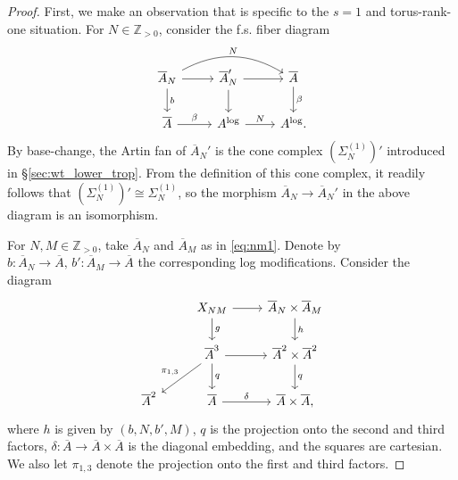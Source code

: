 \documentclass[11pt]{article}
\def\ZZ{\mathbb{Z}}
\renewcommand{\log}{\mathrm{log}}
\newcommand{\barA}{\overline{A}}
\newcommand{\logA}{{A^{\log}}}
\theoremstyle{definition}
\begin{document}
\begin{proof}
    First, we make an observation that is specific to the $s=1$ and torus-rank-one situation.
    For $N \in \ZZ_{>0}$, consider the f.s. fiber diagram
    \begin{equation}\label{eq:nm1}
        \begin{tikzcd}
        \barA_N \ar[r]\ar[d,"b"] \ar[rr, bend left,"N"] & \barA_N' \ar[d] \ar[r] & \barA\ar[d,"\beta"]\\
        \barA \ar[r,"\beta"] & \logA \ar[r,"N"] & \logA.
        \end{tikzcd}
    \end{equation}
	By base-change, the Artin fan of $\barA_N'$ is the cone complex $(\Sigma_N^{(1)})'$
	introduced in \S\ref{sec:wt_lower_trop}.
	From the definition of this cone complex, it readily follows
	that $(\Sigma_N^{(1)})'\cong \Sigma_N^{(1)}$, so
	the morphism $\barA_N\to \barA_N'$ in the above diagram is
	an isomorphism.

    For $N,M \in \ZZ_{>0}$, take $\barA_N$ and $\barA_M$ as in
    \eqref{eq:nm1}. Denote by $b : \barA_N \to \barA, \, b' : \barA_M \to \barA$ the corresponding log modifications. Consider the diagram
    \begin{equation}\label{eq:nm3}
        \begin{tikzcd}
            & X_{NM} \ar[r] \ar[d,"g"] & \barA_N \times \barA_M \ar[d,"h"] \\
            & \barA^3 \ar[r] \ar[dl,"\pi_{1,3}"'] \ar[d,"q"] & \barA^2 \times \barA^2 \ar[d,"q"]\\
            \barA^2 & \barA \ar[r, "\delta"] & \barA \times \barA,
        \end{tikzcd}
    \end{equation}
    where $h$ is given by $(b,N,b',M)$, $q$ is the projection onto the second and third factors, $\delta : \barA \to \barA \times \barA$ is the diagonal embedding, and the squares are cartesian. We also let $\pi_{1,3}$ denote the projection onto the first and third factors.


\end{proof}
\end{document}
